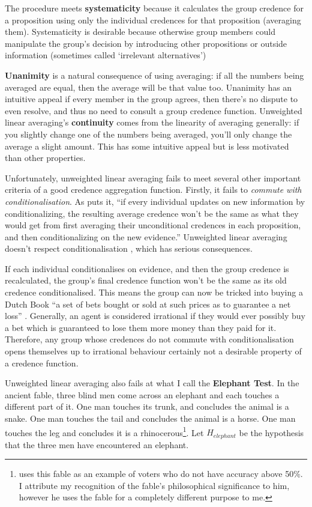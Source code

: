 \documentclass{article}
\begin{document}
The procedure meets \textbf{systematicity} because it calculates the group credence for a proposition using only the individual credences for that proposition (averaging them). Systematicity is desirable because otherwise group members could manipulate the group's decision by introducing other propositions or outside information (sometimes called `irrelevant alternatives')

\textbf{Unanimity} is a natural consequence of using averaging: if all the numbers being averaged are equal, then the average will be that value too. Unanimity has an intuitive appeal \textemdash{} if every member in the group agrees, then there's no dispute to even resolve, and thus no need to consult a group credence function. Unweighted linear averaging's \textbf{continuity} comes from the linearity of averaging generally: if you slightly change one of the numbers being averaged, you'll only change the average a slight amount. This has some intuitive appeal but is less motivated than other properties.

Unfortunately, unweighted linear averaging fails to meet several other important criteria of a good credence aggregation function. Firstly, it fails to \textit{commute with conditionalisation}. As \citet[pg. 1290]{russell2015groupthink} puts it, ``if every individual updates on new information by conditionalizing, the resulting average credence won’t be the same as what they would get from first averaging their unconditional credences in each proposition, and then conditionalizing on the new evidence.'' Unweighted linear averaging doesn't respect conditionalisation \citep[pg. 87]{loewer1985destroying}, which has serious consequences.

If each individual conditionalises on evidence, and then the group credence is recalculated, the group's final credence function won't be the same as its old credence conditionalised. This means the group can now be tricked into buying a Dutch Book \textemdash{} ``a set of bets bought or sold at such prices as to guarantee a net loss'' \citep{hajek2008dutch}. Generally, an agent is considered irrational if they would ever possibly buy a bet which is guaranteed to lose them more money than they paid for it. Therefore, any group whose credences do not commute with conditionalisation opens themselves up to irrational behaviour \textemdash{} certainly not a desirable property of a credence function.

Unweighted linear averaging also fails at what I call the \textbf{Elephant Test}. In the ancient fable, three blind men come across an elephant and each touches a different part of it. One man touches its trunk, and concludes the animal is a snake. One man touches the tail and concludes the animal is a horse. One man touches the leg and concludes it is a rhinocerous\footnote{\citet[pg. 229]{estlund2009democratic} uses this fable as an example of voters who do not have accuracy above 50\%. I attribute my recognition of the fable's philosophical significance to him, however he uses the fable for a completely different purpose to me.}. Let \(H_{elephant}\) be the hypothesis that the three men have encountered an elephant. 
\end{document}
